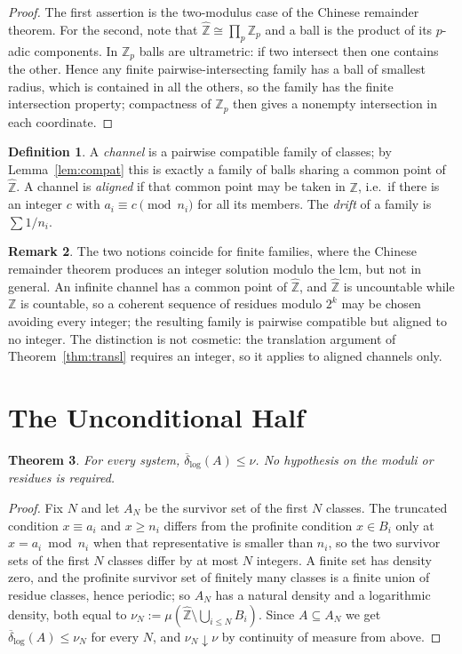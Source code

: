 \documentclass[11pt]{article}
\theoremstyle{plain}
\newtheorem{theorem}{Theorem}[section]
\theoremstyle{definition}
\newtheorem{definition}[theorem]{Definition}
\newtheorem{remark}[theorem]{Remark}
\newcommand{\Zhat}{\widehat{\mathbb{Z}}}
\begin{document}
\begin{proof}
The first assertion is the two-modulus case of the Chinese
remainder theorem.  For the second, note that
$\Zhat\cong\prod_p\mathbb{Z}_p$ and a ball is the product of its
$p$-adic components.  In $\mathbb{Z}_p$ balls are ultrametric:
if two intersect then one contains the other.  Hence any finite
pairwise-intersecting family has a ball of smallest radius,
which is contained in all the others, so the family has the
finite intersection property; compactness of $\mathbb{Z}_p$
then gives a nonempty intersection in each coordinate.
\end{proof}

\begin{definition}
A \emph{channel} is a pairwise compatible family of classes; by
Lemma~\ref{lem:compat} this is exactly a family of balls sharing
a common point of $\Zhat$.  A channel is \emph{aligned} if that
common point may be taken in $\mathbb{Z}$, i.e.\ if there is an
integer $c$ with $a_i\equiv c\pmod{n_i}$ for all its members.
The \emph{drift} of a family is $\sum 1/n_i$.
\end{definition}

\begin{remark}\label{rem:notaligned}
The two notions coincide for finite families, where the Chinese
remainder theorem produces an integer solution modulo the lcm,
but not in general.  An infinite channel has a common point of
$\Zhat$, and $\Zhat$ is uncountable while $\mathbb{Z}$ is
countable, so a coherent sequence of residues modulo $2^k$ may
be chosen avoiding every integer; the resulting family is
pairwise compatible but aligned to no integer.  The distinction
is not cosmetic: the translation argument of
Theorem~\ref{thm:transl} requires an integer, so it applies to
aligned channels only.
\end{remark}

\section{The Unconditional Half}\label{sec:upper}

\begin{theorem}\label{thm:upper}
For every system, $\overline{\delta}_{\log}(A)\le\nu$.  No
hypothesis on the moduli or residues is required.
\end{theorem}

\begin{proof}
Fix $N$ and let $A_N$ be the survivor set of the first $N$
classes.  The truncated condition $x\equiv a_i$ and $x\ge n_i$
differs from the profinite condition $x\in B_i$ only at
$x=a_i\bmod n_i$ when that representative is smaller than $n_i$,
so the two survivor sets of the first $N$ classes differ by at
most $N$ integers.  A finite set has density zero, and the
profinite survivor set of finitely many classes is a finite
union of residue classes, hence periodic; so $A_N$ has a natural
density and a logarithmic density, both equal to
$\nu_N:=\mu(\Zhat\setminus\bigcup_{i\le N}B_i)$.  Since
$A\subseteq A_N$ we get $\overline{\delta}_{\log}(A)\le\nu_N$
for every $N$, and $\nu_N\downarrow\nu$ by continuity of measure
from above.
\end{proof}
\end{document}
